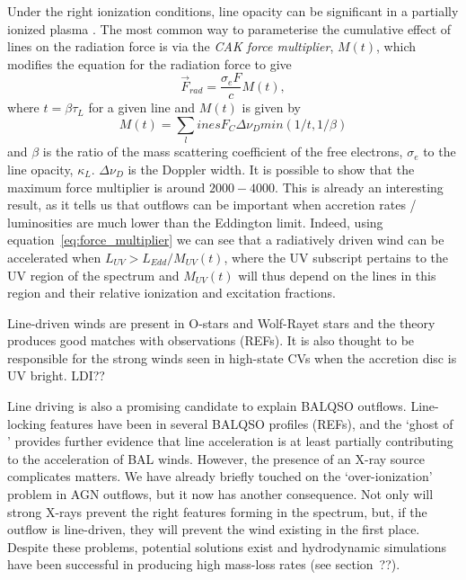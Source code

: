 Under the right ionization conditions, line opacity can be significant in
a partially ionized plasma \citep[][hereafter CAK]{CAK75}. 
The most common way to parameterise the cumulative
effect of lines on the radiation force is via the {\em CAK force multiplier}, $M(t)$,
which modifies the equation for the radiation force to give \citep[][CAK, ]{castor1974}
\begin{equation}
\label{eq:force_multiplier}
\vec{F}_{rad} = \frac{\sigma_e F}{c} M(t),
\end{equation}
where $t = \beta \tau_L$ for a given line and $M(t)$ is given by 
\begin{equation}
\label{eq:force_multiplier2}
M(t) = \sum_lines F_C \Delta \nu_D min (1/t, 1/\beta) 
\end{equation}
and $\beta$ is the ratio of the mass scattering coefficient of the free
electrons, $\sigma_e$ to the line opacity, $\kappa_L$. $\Delta \nu_D$ is the Doppler
width. It is possible to show \citep[CAK, ][]{owocki1988} that the maximum force multiplier
is around $2000-4000$. This is already an interesting result, as it tells us
that outflows can be important when accretion rates / luminosities
are much lower than the Eddington limit. Indeed, using 
equation~\ref{eq:force_multiplier} we can see that a radiatively driven wind 
can be accelerated when $L_{UV} > L_{Edd} / M_{UV}(t)$, where the UV subscript 
pertains to the UV region of the spectrum and $M_{UV}(t)$ will thus depend on
the lines in this region and their relative ionization and excitation fractions.

Line-driven winds are present in O-stars and Wolf-Rayet stars and the theory
produces good matches with observations (REFs). It is also thought to be responsible
for the strong winds seen in high-state CVs when the accretion disc is UV bright.
LDI??

Line driving is also a promising candidate to explain BALQSO outflows. 
Line-locking features have been in several BALQSO profiles (REFs), and 
the `ghost of \la' provides further evidence that line acceleration is 
at least partially contributing to the acceleration of BAL winds. 
However, the presence of an X-ray source complicates matters.
We have already briefly touched on the `over-ionization' problem
in AGN outflows, but it now has another consequence. Not only will 
strong X-rays prevent the right features forming in the spectrum, but, if
the outflow is line-driven, they will prevent the wind existing in the first 
place. Despite these problems, potential solutions exist and hydrodynamic
simulations have been successful in producing high mass-loss rates (see section~??).

